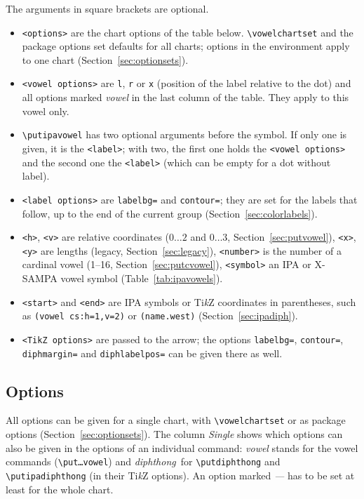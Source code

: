 \documentclass[a4paper,11pt]{article}
\newcommand\cmd[1]{\texttt{\textbackslash #1}}
\newcommand\opt[1]{\texttt{#1}}
\begin{document}
\noindent
The arguments in square brackets are optional.
\begin{itemize}
	\item
	\texttt{<options>} are the chart options of the table below. \cmd{vowelchartset} and the package options set defaults for all charts; options in the environment apply to one chart (Section~\ref{sec:optionsets}).
	\item
	\texttt{<vowel options>} are \opt{l}, \opt{r} or \opt{x} (position of the label relative to the dot) and all options marked \emph{vowel} in the last column of the table. They apply to this vowel only.
	\item
	\cmd{putipavowel} has two optional arguments before the symbol. If only one is given, it is the \texttt{<label>}; with two, the first one holds the \texttt{<vowel options>} and the second one the \texttt{<label>} (which can be empty for a dot without label).
	\item
	\texttt{<label options>} are \opt{labelbg=} and \opt{contour=}; they are set for the labels that follow, up to the end of the current group (Section~\ref{sec:colorlabels}).
	\item
	\texttt{<h>}, \texttt{<v>} are relative coordinates ($0\ldots2$ and $0\ldots3$, Section~\ref{sec:putvowel}), \texttt{<x>}, \texttt{<y>} are lengths (legacy, Section~\ref{sec:legacy}), \texttt{<number>} is the number of a cardinal vowel (1--16, Section~\ref{sec:putcvowel}), \texttt{<symbol>} an IPA or X-SAMPA vowel symbol (Table~\ref{tab:ipavowels}).
	\item
	\texttt{<start>} and \texttt{<end>} are IPA symbols or Ti\textit{k}Z coordinates in parentheses, such as \texttt{(vowel cs:h=1,v=2)} or \texttt{(name.west)} (Section~\ref{sec:ipadiph}).
	\item
	\texttt{<TikZ options>} are passed to the arrow; the options \opt{labelbg=}, \opt{contour=}, \opt{diphmargin=} and \opt{diphlabelpos=} can be given there as well.
\end{itemize}

\subsection*{Options}

All options can be given for a single chart, with \cmd{vowelchartset} or as package options (Section~\ref{sec:optionsets}). The column \emph{Single} shows which options can also be given in the options of an individual command: \emph{vowel} stands for the vowel commands (\cmd{put\dots vowel}) and \emph{diphthong}\ for \cmd{putdiphthong} and \cmd{putipadiphthong} (in their Ti\textit{k}Z options). An option marked \emph{---} has to be set at least for the whole chart.
\end{document}
